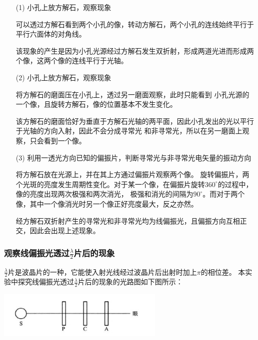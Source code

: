 \documentclass{article}
\newcommand{\degree}{^\circ}
\begin{document}
    \begin{itemize}
        \item [(1)]
        小孔上放方解石\uppercase\expandafter{}，观察现象

        可以透过方解石看到两个小孔的像，转动方解石，两个小孔的连线始终平行于平行六面体的对角线。

        该现象的产生是因为小孔光源经过方解石发生双折射，形成两道光进而形成两个像，这两个像的连线平行于光轴。

        \item [(2)]
        小孔上放方解石\uppercase\expandafter{}，观察现象

        将方解石\uppercase\expandafter{}的磨面压在小孔上，透过另一磨面观察，此时只能看到
        小孔光源的一个像，且旋转方解石，像的位置基本不发生变化。

        该方解石的磨面恰好为垂直于方解石光轴的两平面，因此小孔发出的光以平行于光轴的方向入射，因此不会分成寻常光
        和非寻常光，所以在另一磨面上观察，只会看到一个像。

        \item [(3)]
        利用一透光方向已知的偏振片，判断寻常光与非寻常光电矢量的振动方向

        将方解石\uppercase\expandafter{}放在光源上，并在其上方通过偏振片观察两个像。
        旋转偏振片，两个光斑的亮度发生周期性变化。对于某一个像，在偏振片旋转$360\degree$的过程中，像的亮度出现两次极强和两次消光，
        极强和消光的间隔为$90\degree$。而对于两个像，其中一个像消光时另一个像正好亮度最大，反之亦然。

        经方解石双折射产生的寻常光和非寻常光均为线偏振光，且偏振方向互相正交，因此会出现上述现象。
    \end{itemize}

    \subsubsection{观察线偏振光透过$\frac{\lambda}{2}$片后的现象}
    $\frac{\lambda}{2}$片是波晶片的一种，它能使入射光线经过波晶片后出射时加上$\pi$的相位差。
    本实验中探究线偏振光透过$\frac{\lambda}{2}$片后的现象的光路图如下图所示：
    
    \begin{center}
        \includegraphics[width=0.6\textwidth]{波晶片.jpg}
    \end{center}
\end{document}
